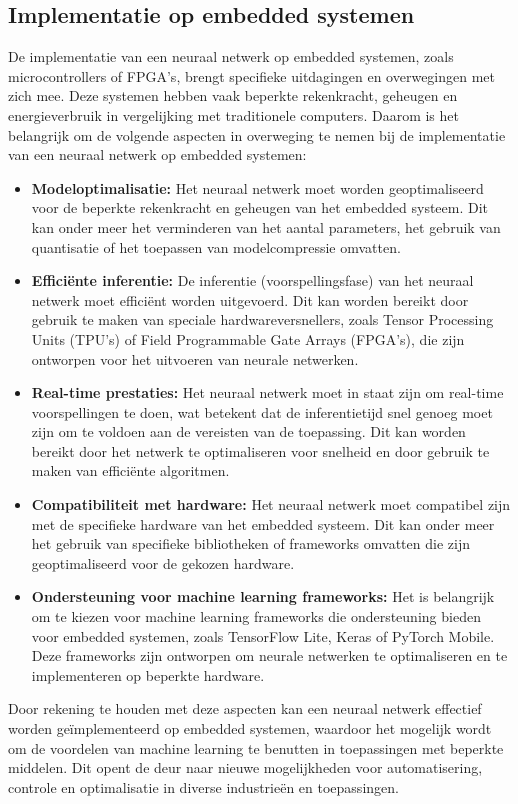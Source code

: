 \subsection{Implementatie op embedded systemen}
De implementatie van een neuraal netwerk op embedded systemen, zoals microcontrollers of FPGA's, brengt specifieke uitdagingen en overwegingen met zich mee. Deze systemen hebben vaak beperkte rekenkracht, geheugen en energieverbruik in vergelijking met traditionele computers. Daarom is het belangrijk om de volgende aspecten in overweging te nemen bij de implementatie van een neuraal netwerk op embedded systemen:
\begin{itemize}
  \item \textbf{Modeloptimalisatie:} Het neuraal netwerk moet worden geoptimaliseerd voor de beperkte rekenkracht en geheugen van het embedded systeem. Dit kan onder meer het verminderen van het aantal parameters, het gebruik van quantisatie of het toepassen van modelcompressie omvatten.
  \item \textbf{Efficiënte inferentie:} De inferentie (voorspellingsfase) van het neuraal netwerk moet efficiënt worden uitgevoerd. Dit kan worden bereikt door gebruik te maken van speciale hardwareversnellers, zoals Tensor Processing Units (TPU's) of Field Programmable Gate Arrays (FPGA's), die zijn ontworpen voor het uitvoeren van neurale netwerken.
  \item \textbf{Real-time prestaties:} Het neuraal netwerk moet in staat zijn om real-time voorspellingen te doen, wat betekent dat de inferentietijd snel genoeg moet zijn om te voldoen aan de vereisten van de toepassing. Dit kan worden bereikt door het netwerk te optimaliseren voor snelheid en door gebruik te maken van efficiënte algoritmen.
  \item \textbf{Compatibiliteit met hardware:} Het neuraal netwerk moet compatibel zijn met de specifieke hardware van het embedded systeem. Dit kan onder meer het gebruik van specifieke bibliotheken of frameworks omvatten die zijn geoptimaliseerd voor de gekozen hardware.
  \item \textbf{Ondersteuning voor machine learning frameworks:} Het is belangrijk om te kiezen voor machine learning frameworks die ondersteuning bieden voor embedded systemen, zoals TensorFlow Lite, Keras of PyTorch Mobile. Deze frameworks zijn ontworpen om neurale netwerken te optimaliseren en te implementeren op beperkte hardware.
\end{itemize}
Door rekening te houden met deze aspecten kan een neuraal netwerk effectief worden geïmplementeerd op embedded systemen, waardoor het mogelijk wordt om de voordelen van machine learning te benutten in toepassingen met beperkte middelen. Dit opent de deur naar nieuwe mogelijkheden voor automatisering, controle en optimalisatie in diverse industrieën en toepassingen.

